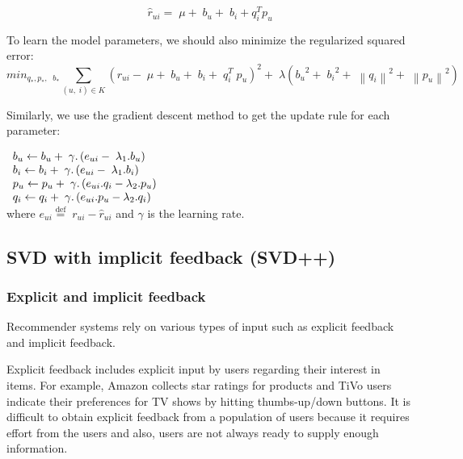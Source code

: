 \documentclass[oneside,13pt]{extreport}
\begin{document}
\begin{equation}
{\hat r_{ui}} = \;\mu  + \;{b_u} + \;{b_i} + q_i^T{p_u}
\label{eq: SVD}
\end{equation}

To learn the model parameters, we should also minimize the regularized squared error:
\begin{equation}
mi{n_{{q_*},{p_*},\;\;{b_*}}}\mathop \sum \limits_{\left( {u,\;i} \right) \in K} {\left( {{r_{ui}} - \;\mu  + \;{b_u} + \;{b_i} + \;q_i^T\;{p_u}} \right)^2} + \;\lambda \left( {{b_u}^2 + \;{b_i}^2 + \;{{\left\| {{q_i}} \right\|}^2} + \;{{\left\| {{p_u}} \right\|}^2}} \right)
\end{equation}

Similarly, we use the gradient descent method to get the update rule for each parameter:

$
\begin{array}{l}{b_u} \leftarrow {b_u} + {\rm{\;}}\gamma .\left( {{e_{ui}} - {\rm{\;}}{\lambda _1}.{b_u}} \right)\\{b_i} \leftarrow {b_i} + {\rm{\;}}\gamma .\left( {{e_{ui}} - {\rm{\;}}{\lambda _1}.{b_i}} \right)\\{p_u} \leftarrow {p_u} + {\rm{\;}}\gamma .\left( {{e_{ui}}.{q_i} - {\lambda _2}.{p_u}} \right)\\{q_i} \leftarrow {q_i} + {\rm{\;}}\gamma .\left( {{e_{ui}}.{p_u} - {\lambda _2}.{q_i}} \right)\end{array}
$
\\
where ${e_{ui}} \stackrel{\text{def}}{=} \;{r_{ui}} - \hat r_{ui}$ and $\gamma$ is the learning rate.

\subsection{SVD with implicit feedback (SVD++)}
\subsubsection{Explicit and implicit feedback}
Recommender systems rely on various types of input such as explicit feedback and implicit feedback. 

Explicit feedback includes explicit input by users regarding their interest in items. For example, Amazon collects star ratings for products and TiVo users indicate their
preferences for TV shows by hitting thumbs-up/down buttons. It is difficult to obtain explicit  feedback from a population of users because it requires effort from the users and also, users are not always ready to supply enough information. 
\end{document}
